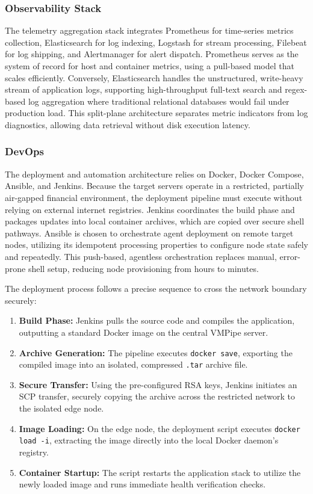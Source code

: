 \documentclass[12pt,a4paper]{report}
\begin{document}
\subsubsection{Observability Stack}
The telemetry aggregation stack integrates Prometheus for time-series metrics collection, Elasticsearch for log indexing, Logstash for stream processing, Filebeat for log shipping, and Alertmanager for alert dispatch. Prometheus serves as the system of record for host and container metrics, using a pull-based model that scales efficiently. Conversely, Elasticsearch handles the unstructured, write-heavy stream of application logs, supporting high-throughput full-text search and regex-based log aggregation where traditional relational databases would fail under production load. This split-plane architecture separates metric indicators from log diagnostics, allowing data retrieval without disk execution latency.

\subsubsection{DevOps}
The deployment and automation architecture relies on Docker, Docker Compose, Ansible, and Jenkins. Because the target servers operate in a restricted, partially air-gapped financial environment, the deployment pipeline must execute without relying on external internet registries. Jenkins coordinates the build phase and packages updates into local container archives, which are copied over secure shell pathways. Ansible is chosen to orchestrate agent deployment on remote target nodes, utilizing its idempotent processing properties to configure node state safely and repeatedly. This push-based, agentless orchestration replaces manual, error-prone shell setup, reducing node provisioning from hours to minutes.

The deployment process follows a precise sequence to cross the network boundary securely:
\begin{enumerate}
  \item \textbf{Build Phase:} Jenkins pulls the source code and compiles the application, outputting a standard Docker image on the central VMPipe server.
  \item \textbf{Archive Generation:} The pipeline executes \texttt{docker save}, exporting the compiled image into an isolated, compressed \texttt{.tar} archive file.
  \item \textbf{Secure Transfer:} Using the pre-configured RSA keys, Jenkins initiates an SCP transfer, securely copying the archive across the restricted network to the isolated edge node.
  \item \textbf{Image Loading:} On the edge node, the deployment script executes \texttt{docker load -i}, extracting the image directly into the local Docker daemon's registry.
  \item \textbf{Container Startup:} The script restarts the application stack to utilize the newly loaded image and runs immediate health verification checks.
\end{enumerate}
\end{document}

